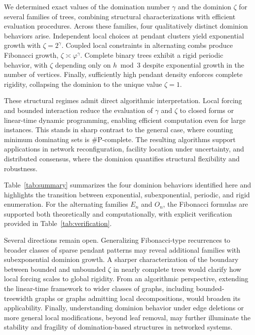 \documentclass[11pt]{article}
\theoremstyle{definition}
\theoremstyle{remark}
\begin{document}
We determined exact values of the domination number $\gamma$ and the dominion $\zeta$ for several
families of trees, combining structural characterizations with efficient evaluation procedures.
Across these families, four qualitatively distinct dominion behaviors arise.
Independent local choices at pendant clusters yield exponential growth with $\zeta=2^{\gamma}$.
Coupled local constraints in alternating combs produce Fibonacci growth,
$\zeta\asymp \varphi^{\gamma}$.
Complete binary trees exhibit a rigid periodic behavior, with $\zeta$ depending only on $h \bmod 3$
despite exponential growth in the number of vertices.
Finally, sufficiently high pendant density enforces complete rigidity, collapsing the dominion to
the unique value $\zeta=1$.

These structural regimes admit direct algorithmic interpretation.
Local forcing and bounded interaction reduce the evaluation of $\gamma$ and $\zeta$ to closed forms
or linear-time dynamic programming, enabling efficient computation even for large instances.
This stands in sharp contrast to the general case, where counting minimum dominating sets is
$\#\mathrm{P}$-complete.
The resulting algorithms support applications in network reconfiguration, facility location under
uncertainty, and distributed consensus, where the dominion quantifies structural flexibility and
robustness.

Table~\ref{tab:summary} summarizes the four dominion behaviors identified here and highlights the
transition between exponential, subexponential, periodic, and rigid enumeration.
For the alternating families $E_n$ and $O_n$, the Fibonacci formulas are supported both theoretically
and computationally, with explicit verification provided in Table~\ref{tab:verification}.

Several directions remain open.
Generalizing Fibonacci-type recurrences to broader classes of sparse pendant patterns may reveal
additional families with subexponential dominion growth.
A sharper characterization of the boundary between bounded and unbounded $\zeta$ in nearly complete
trees would clarify how local forcing scales to global rigidity.
From an algorithmic perspective, extending the linear-time framework to wider classes of graphs,
including bounded-treewidth graphs or graphs admitting local decompositions, would broaden its
applicability.
Finally, understanding dominion behavior under edge deletions or more general local modifications,
beyond leaf removal, may further illuminate the stability and fragility of domination-based
structures in networked systems.
\end{document}
